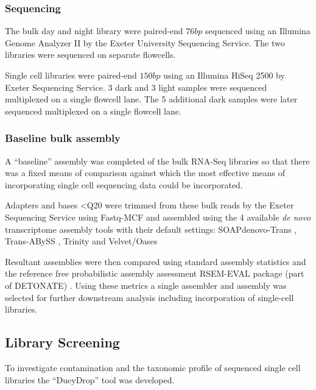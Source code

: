 \subsubsection{Sequencing}

The bulk day and night library were paired-end \(76bp\) sequenced using an Illumina Genome
Analyzer II by the Exeter University Sequencing Service.  The two libraries were sequenced
on separate flowcells.

Single cell libraries were paired-end \(150bp\) using an Illumina HiSeq 2500 by Exeter
Sequencing Service. 3 dark and 3 light samples were sequenced multiplexed on a single 
flowcell lane.  The 5 additional dark samples were later sequenced multiplexed on a single
flowcell lane.

\subsubsection{Baseline bulk assembly}

A ``baseline'' assembly was completed of the bulk RNA-Seq libraries so that there was a fixed
means of comparison against which the most effective means of incorporating single cell
sequencing data could be incorporated.

Adapters and bases <Q20 were trimmed from these bulk reads by the Exeter Sequencing Service
using Fastq-MCF \citep{Aronesty2013} and assembled using the 4 available \textit{de novo} 
transcriptome assembly tools with their default settings: SOAPdenovo-Trans \citep{Xie2014}, 
Trans-ABySS \citep{Robertson2010}, Trinity \citep{Haas2013} and Velvet/Oases \citep{Schulz2012a}

Resultant assemblies were then compared using standard assembly statistics and the reference
free probabilistic assembly assessment RSEM-EVAL package (part of DETONATE) \citep{Li2014}.
Using these metrics a single assembler and assembly was selected for further downstream
analysis including incorporation of single-cell libraries.

\subsection{Library Screening}

To investigate contamination and the taxonomic profile of sequenced single cell libraries 
the ``DueyDrop'' tool was developed.  

